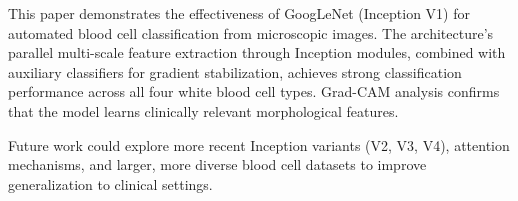 \documentclass[conference]{IEEEtran}
\begin{document}
This paper demonstrates the effectiveness of GoogLeNet (Inception V1) for automated blood cell classification from microscopic images. The architecture's parallel multi-scale feature extraction through Inception modules, combined with auxiliary classifiers for gradient stabilization, achieves strong classification performance across all four white blood cell types. Grad-CAM analysis confirms that the model learns clinically relevant morphological features.

Future work could explore more recent Inception variants (V2, V3, V4), attention mechanisms, and larger, more diverse blood cell datasets to improve generalization to clinical settings.



\end{document}
